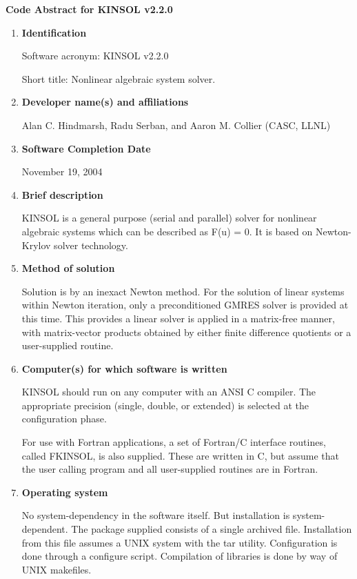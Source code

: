 \documentclass[12pt]{letter}
\begin{document}
\pagestyle{empty}

\begin{letter}

\vspace{0.2in}
\centerline{\bf Code Abstract for KINSOL v2.2.0}

\begin{enumerate}

\item {\bf Identification}

Software acronym: KINSOL v2.2.0

Short title: Nonlinear algebraic system solver.

\item {\bf Developer name(s) and affiliations}

Alan C. Hindmarsh, Radu Serban, and Aaron M. Collier (CASC, LLNL)

\item {\bf Software Completion Date}

November 19, 2004

\item {\bf Brief description}

KINSOL is a general purpose (serial and parallel) solver for nonlinear algebraic 
systems which can be described as F(u) = 0. It is based on  Newton-Krylov
solver technology.

\item {\bf Method of solution}

Solution is by an inexact Newton method. For the solution of linear systems within 
Newton iteration, only a preconditioned GMRES solver is provided at this time.
This provides a linear solver is applied in a matrix-free manner, with matrix-vector 
products obtained by either finite difference quotients or a user-supplied routine.

\item {\bf Computer(s) for which software is written}

KINSOL should run on any computer with an ANSI C compiler. The appropriate 
precision (single, double, or extended) is selected at the configuration phase.

For use with Fortran applications, a set of Fortran/C interface routines,
called FKINSOL, is also supplied.  These are written in C, but assume that
the user calling program and all user-supplied routines are in Fortran.

\item {\bf Operating system}

No system-dependency in the software itself. But installation is system-dependent. 
The package supplied consists of a single archived file. Installation from this file 
assumes a UNIX system with the tar utility. Configuration is done through a 
configure script. Compilation of libraries is done by way of UNIX makefiles.


\end{enumerate}
\end{letter}
\end{document}

